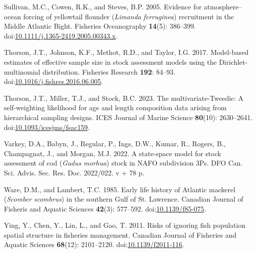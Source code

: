 \begin{CSLReferences}{1}{0}
\leavevmode{}%
Sullivan, M.C., Cowen, R.K., and Steves, B.P. 2005. Evidence for atmosphere{--}ocean forcing of yellowtail flounder (\emph{{L}imanda} \emph{ferruginea}) recruitment in the {M}iddle {A}tlantic {B}ight. Fisheries Oceanography \textbf{14}(5): 386--399. doi:\href{https://doi.org/10.1111/j.1365-2419.2005.00343.x}{10.1111/j.1365-2419.2005.00343.x}.

\leavevmode{}%
Thorson, J.T., Johnson, K.F., Methot, R.D., and Taylor, I.G. 2017. Model-based estimates of effective sample size in stock assessment models using the {D}irichlet-multinomial distribution. Fisheries Research \textbf{192}: 84--93. doi:\href{https://doi.org/10.1016/j.fishres.2016.06.005}{10.1016/j.fishres.2016.06.005}.

\leavevmode{}%
Thorson, J.T., Miller, T.J., and Stock, B.C. 2023. The multivariate-{T}weedie: A self-weighting likelihood for age and length composition data arising from hierarchical sampling designs. ICES Journal of Marine Science \textbf{80}(10): 2630--2641. doi:\href{https://doi.org/10.1093/icesjms/fsac159}{10.1093/icesjms/fsac159}.

\leavevmode{}%
Varkey, D.A., Babyn, J., Regular, P., Ings, D.W., Kumar, R., Rogers, B., Champagnat, J., and Morgan, M.J. 2022. A state-space model for stock assessment of cod (\emph{{G}adus morhua}) stock in NAFO subdivision 3Ps. {DFO} {Can.} {Sci.} {Advis.} {Sec.} {Res.} {Doc.} 2022/022. v + 78 p.

\leavevmode{}%
Ware, D.M., and Lambert, T.C. 1985. Early life history of {A}tlantic mackerel (\emph{{S}comber scombrus}) in the southern {G}ulf of {S}t. {L}awrence. Canadian Journal of Fisheris and Aquatic Sciences \textbf{42}(3): 577--592. doi:\href{https://doi.org/10.1139/f85-075}{10.1139/f85-075}.

\leavevmode{}%
Ying, Y., Chen, Y., Lin, L., and Gao, T. 2011. Risks of ignoring fish population spatial structure in fisheries management. Canadian Journal of Fisheries and Aquatic Sciences \textbf{68}(12): 2101--2120. doi:\href{https://doi.org/10.1139/f2011-116}{10.1139/f2011-116}.

\end{CSLReferences}
